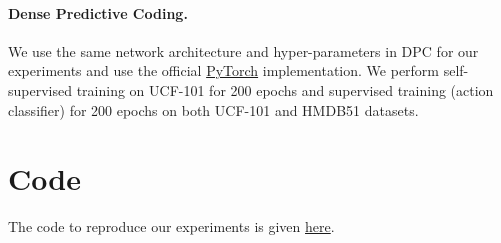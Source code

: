 \documentclass{article} \usepackage{iclr2021_conference,times}
\begin{document}
\paragraph{Dense Predictive Coding.} We use the same network architecture and hyper-parameters in DPC \cite{han2019video} for our experiments and use the official \href{https://github.com/TengdaHan/DPC}{PyTorch} implementation. We perform self-supervised training on UCF-101 for 200 epochs and supervised training (action classifier) for 200 epochs on both UCF-101 and HMDB51 datasets.

\section{Code}
The code to reproduce our experiments is given \href{https://anonymous.4open.science/r/99219ca9-ff6a-49e5-a525-c954080de8a7/}{here}. 
\end{document}
